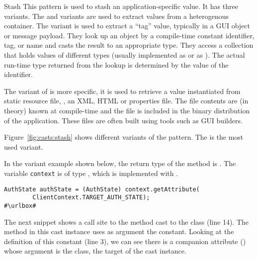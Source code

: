 \begin{pattern}{Stash}
This pattern is used to stash an application-specific value.
It has three variants.
The  and  variants are used to extract values from a heterogenous container.
The  variant is used to extract a ``tag'' value, 
typically in a GUI object or message payload.
They look up an object by a compile-time constant identifier, tag, or name and casts the result to an appropriate type.
They access a collection that holds values of different types
(usually implemented as  or as ).
The actual run-time type returned from the lookup is determined by the value of the identifier.

The  variant of is more specific,
it is used to retrieve a value instantiated from static resource file,
\eg, an XML, HTML or \java{} properties file.
The file contents are (in theory) known at compile-time and the file is included in the binary distribution of the application.
These files are often built using tools such as GUI builders.

\instances{}
Figure~\ref{fig:casts:stash} shows different variants of the pattern.
The  is the most used variant.


In the  variant example shown below,
the return type of the  method is .
The variable \texttt{context} is of type ,
which is implemented with .

\def\urlvar{http://bit.ly/loopj_android_async_http_2SUzY4E}
\begin{verbatim}
AuthState authState = (AuthState) context.getAttribute(
        ClientContext.TARGET_AUTH_STATE);
#\urlbox#
\end{verbatim}

The next snippet shows a call site to the  method cast to the  class (line 14).
The  method in this cast instance uses as argument the  constant.
Looking at the definition of this constant (line 3),
we can see there is a companion attribute () whose argument is the  class, the target of the cast instance.


\end{pattern}
